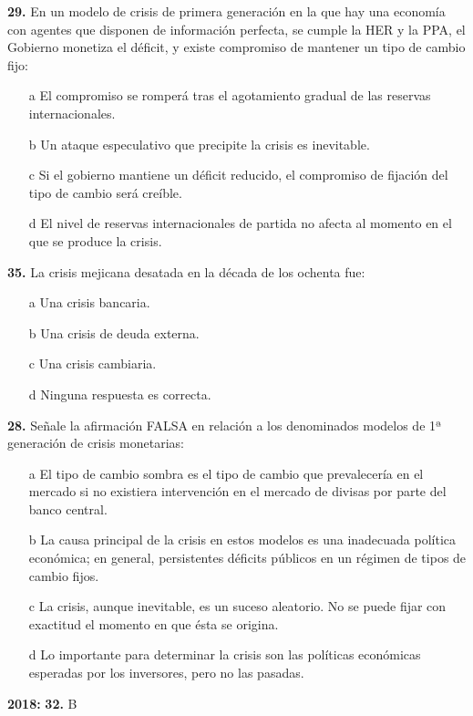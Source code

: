\documentclass{nuevotema}
\begin{document}
\textbf{29.} En un modelo de crisis de primera generación en la que hay una economía con agentes que disponen de información perfecta, se cumple la HER y la PPA, el Gobierno monetiza el déficit, y existe compromiso de mantener un tipo de cambio fijo:
\begin{itemize}
	\item[a] El compromiso se romperá tras el agotamiento gradual de las reservas internacionales.
	\item[b] Un ataque especulativo que precipite la crisis es inevitable.
	\item[c] Si el gobierno mantiene un déficit reducido, el compromiso de fijación del tipo de cambio será creíble.
	\item[d] El nivel de reservas internacionales de partida no afecta al momento en el que se produce la crisis.
\end{itemize}

\textbf{35.} La crisis mejicana desatada en la década de los ochenta fue:
\begin{itemize}
	\item[a] Una crisis bancaria.
	\item[b] Una crisis de deuda externa.
	\item[c] Una crisis cambiaria. 
	\item[d] Ninguna respuesta es correcta.
\end{itemize}

\textbf{28.} Señale la afirmación FALSA en relación a los denominados modelos de 1ª generación de crisis monetarias:
\begin{itemize}
	\item[a] El tipo de cambio sombra es el tipo de cambio que prevalecería en el mercado si no existiera intervención en el mercado de divisas por parte del banco central.
	\item[b] La causa principal de la crisis en estos modelos es una inadecuada política económica; en general, persistentes déficits públicos en un régimen de tipos de cambio fijos.
	\item[c] La crisis, aunque inevitable, es un suceso aleatorio. No se puede fijar con exactitud el momento en que ésta se origina.
	\item[d] Lo importante para determinar la crisis son las políticas económicas esperadas por los inversores, pero no las pasadas.
\end{itemize}

\notas


\textbf{2018:} \textbf{32.} B
\end{document}
